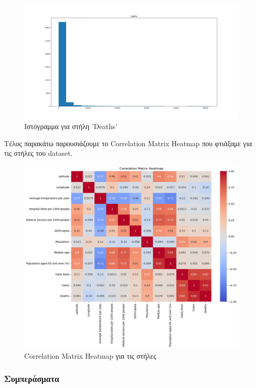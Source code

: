 \documentclass[12pt,a4paper]{article}
\begin{document}
\begin{figure}[H]
	\includegraphics[width=\textwidth]{Figures/Question1/13. Histogram for deaths.png}
	\caption{Ιστόγραμμα για στήλη 'Deaths'}
\end{figure}

Τέλος παρακάτω παρουσιάζουμε το Correlation Matrix Heatmap που φτιάξαμε για τις στήλες του dataset.

\begin{figure}[H]
	\includegraphics[width=\textwidth]{Figures/Question1/14. Correlation matrix heatmap.png}
	\caption{Correlation Matrix Heatmap για τις στήλες}
\end{figure}

\subsubsection{Συμπεράσματα}
\end{document}
